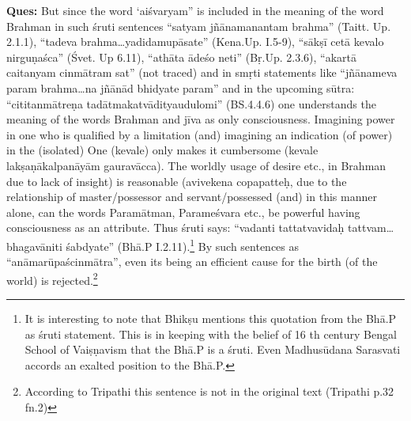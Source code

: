 \textbf{Ques:} But since the word ‘aiśvaryam” is included in the meaning of the word Brahman in such śruti sentences “satyam jñānamanantam brahma” (Taitt. Up. 2.1.1), “tadeva brahma…yadidamupāsate”  (Kena.\break Up. I.5-9), “sākṣī cetā kevalo nirguṇaśca” (Śvet. Up 6.11), “athāta ādeśo neti” (Bṛ.Up. 2.3.6), “akartā caitanyam cinmātram sat” (not traced) and in smṛti statements like “jñānameva param brahma…na jñānād bhidyate param” and in the upcoming sūtra: “cititanmātreṇa tadātmakatvādityaudulomi” (BS.4.4.6) one understands the meaning of the words Brahman and jīva as only consciousness. Imagining power in one who  is qualified by a limitation (and) imagining an indication (of power) in the (isolated) One (kevale) only makes it cumbersome (kevale lakṣaṇākalpanāyām gauravācca). The worldly usage of desire etc., in Brahman due to lack of insight) is reasonable (avivekena copapatteḥ, due to the relationship of master/possessor and servant/possessed (and) in this manner alone, can the words Paramātman, Parameśvara etc., be powerful having consciousness as an attribute. Thus śruti says: “vadanti tattatvavidaḥ tattvam…bhagavāniti śabdyate” (Bhā.P I.2.11).\footnote{It is interesting to note that Bhikṣu mentions this quotation from the Bhā.P as śruti statement. This is in keeping with the belief of 16 th century Bengal School of Vaiṣṇavism that the Bhā.P is a śruti. Even Madhusūdana Sarasvati accords an exalted position to the Bhā.P.} By such sentences as “anāmarūpaścinmātra”, even its being an efficient cause for the birth (of the world) is rejected.\footnote{According to Tripathi this sentence is not in the original text (Tripathi p.32 fn.2)} 

